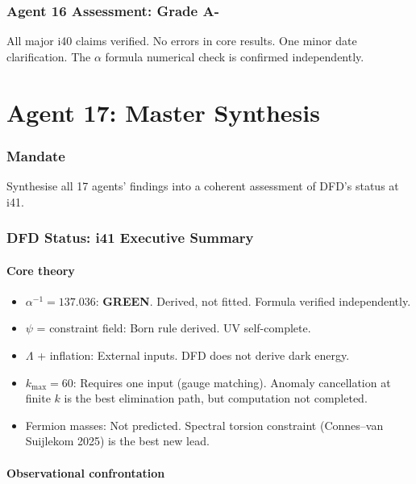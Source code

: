 \documentclass[11pt,a4paper]{article}
\newcommand{\GREEN}{\textcolor{dfdgreen}{\textbf{GREEN}}}
\begin{document}
\section{Agent 16 Assessment: Grade A-}

All major i40 claims verified. No errors in core results. One minor date clarification. The $\alpha$ formula numerical check is confirmed independently.


\part{Agent 17: Master Synthesis}
\label{part:agent17}

\section{Mandate}

Synthesise all 17 agents' findings into a coherent assessment of DFD's status at i41.

\section{DFD Status: i41 Executive Summary}

\subsection{Core theory}

\begin{itemize}
\item $\alpha^{-1} = 137.036$: \GREEN. Derived, not fitted. Formula verified independently.
\item $\psi$ = constraint field: Born rule derived. UV self-complete.
\item $\Lambda$ + inflation: External inputs. DFD does not derive dark energy.
\item $k_{\max} = 60$: Requires one input (gauge matching). Anomaly cancellation at finite $k$ is the best elimination path, but computation not completed.
\item Fermion masses: Not predicted. Spectral torsion constraint (Connes--van Suijlekom 2025) is the best new lead.
\end{itemize}

\subsection{Observational confrontation}
\end{document}
